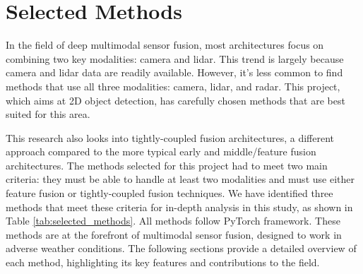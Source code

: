 \documentclass[report.tex]{subfiles}
\begin{document}
    \section{Selected Methods}


    In the field of deep multimodal sensor fusion, most architectures focus on combining two key modalities: camera and lidar. This trend is largely because camera and lidar data are readily available. However, it's less common to find methods that use all three modalities: camera, lidar, and radar. This project, which aims at 2D object detection, has carefully chosen methods that are best suited for this area.

    This research also looks into tightly-coupled fusion architectures, a different approach compared to the more typical early and middle/feature fusion architectures. The methods selected for this project had to meet two main criteria: they must be able to handle at least two modalities and must use either feature fusion or tightly-coupled fusion techniques. We have identified three methods that meet these criteria for in-depth analysis in this study, as shown in Table \ref{tab:selected_methods}. All methods follow PyTorch framework. These methods are at the forefront of multimodal sensor fusion, designed to work in adverse weather conditions. The following sections provide a detailed overview of each method, highlighting its key features and contributions to the field.
\end{document}
